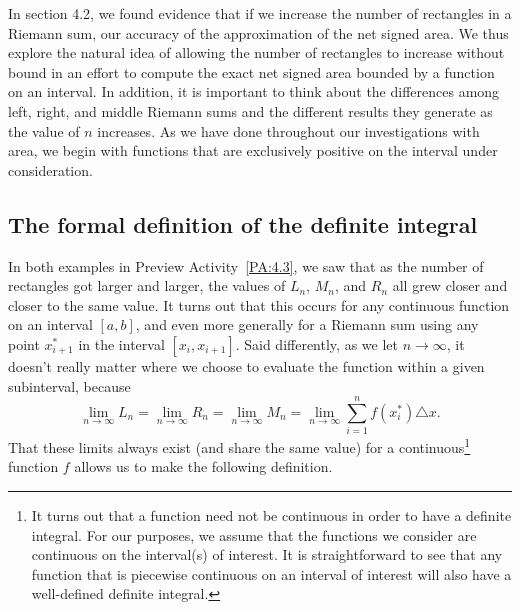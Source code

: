 \pagebreak


In section 4.2, we found evidence that if we increase the number of rectangles in a Riemann sum, our accuracy of the approximation of the net signed area. We thus explore the natural idea of allowing the number of rectangles to increase without bound in an effort to compute the exact net signed area bounded by a function on an interval.  In addition, it is important to think about the differences among left, right, and middle Riemann sums and the different results they generate as the value of $n$ increases.  As we have done throughout our investigations with area, we begin with functions that are exclusively positive on the interval under consideration.

\pagebreak


\subsection*{The formal definition of the definite integral} 

In both examples in Preview Activity~\ref{PA:4.3}, we saw that as the number of rectangles got larger and larger, the values of $L_n$, $M_n$, and $R_n$ all grew closer and closer to the same value.  It turns out that this occurs for any continuous function on an interval $[a,b]$, and even more generally for a Riemann sum using any point $x_{i+1}^*$ in the interval $[x_i, x_{i+1}]$.  Said differently, as we let $n \to \infty$, it doesn't really matter where we choose to evaluate the function within a given subinterval, because
\[ \lim_{n \to \infty} L_n = \lim_{n \to \infty} R_n = \lim_{n \to \infty} M_n = \lim_{n \to \infty} \sum_{i=1}^{n} f(x_i^*) \triangle x.\]
That these limits always exist (and share the same value) for a continuous\footnote{It turns out that a function need not be continuous in order to have a definite integral.  For our purposes, we assume that the functions we consider are continuous on the interval(s) of interest.  It is straightforward to see that any function that is piecewise continuous on an interval of interest will also have a well-defined definite integral.} function $f$ allows us to make the following definition.

